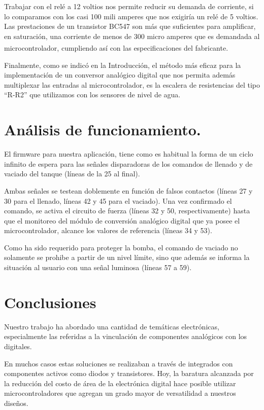 ﻿\documentclass[a4paper]{article}
\let\originalcite\cite
\renewcommand{\cite}[2][]{\textsuperscript{\originalcite{#2}}}
\begin{document}
Trabajar con el relé a 12 voltios nos permite reducir 
su demanda de corriente, si lo comparamos con los casi 
100 mili amperes que nos exigiría un relé de 5 voltios. 
Las prestaciones de un transistor BC547 son más que 
suficientes para amplificar, en saturación, una corriente
de menos de 300 micro amperes que es demandada al 
microcontrolador, cumpliendo así con las especificaciones 
del fabricante\cite{bib:datasheet}.

Finalmente, como se indicó en la Introducción, el método
más eficaz para la implementación de un conversor 
analógico digital que nos permita además multiplexar las
entradas al microcontrolador, es la escalera de 
resistencias del tipo ``R-R2'' que utilizamos con los 
sensores de nivel de agua.

\section{Análisis de funcionamiento.}

El firmware para nuestra aplicación, tiene como es 
habitual la forma de un ciclo infinito de espera para 
las señales disparadoras de los comandos de llenado y de 
vaciado del tanque (líneas de la 25 al final).

Ambas señales se testean doblemente en función de falsos
contactos (líneas 27 y 30 para el llenado, líneas 42 y 45 
para el vaciado). Una vez confirmado el comando, se activa
el circuito de fuerza (líneas 32 y 50, respectivamente) 
hasta que el monitoreo del módulo de conversión analógico 
digital que ya posee el microcontrolador, alcance los 
valores de referencia (líneas 34 y 53).

Como ha sido requerido para proteger la bomba, el comando
de vaciado no solamente se prohibe a partir de un nivel
límite, sino que además se informa la situación al usuario
con una señal luminosa (líneas 57 a 59).

\section{Conclusiones}

Nuestro trabajo ha abordado una cantidad de temáticas 
electrónicas, especialmente las referidas a la vinculación
de componentes analógicos con los digitales.

En muchos casos estas soluciones se realizaban a través 
de integrados con componentes activos como
diodos y transistores. Hoy, la baratura alcanzada por 
la reducción del costo de área de la electrónica digital
hace posible utilizar microcontroladores que agregan un
grado mayor de versatilidad a nuestros diseños.
\end{document}
